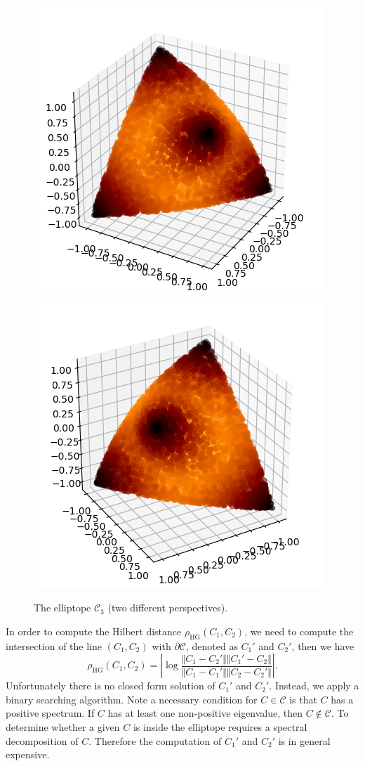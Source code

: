 \documentclass[graybox]{svmult}
\begin{document}
\begin{figure}[t]
\centering
\includegraphics[width=.4\textwidth]{elliptope30}
\includegraphics[width=.4\textwidth]{elliptope60}
\caption{The elliptope $\mathcal{C}_3$ (two different perspectives).}\label{fig:elliptope}
\end{figure}

In order to compute the Hilbert distance $\rho_{\mathrm{HG}}(C_1,C_2)$, we
need to compute the intersection of the line $(C_1,C_2)$ with 
$\partial\mathcal{C}$, denoted as $C_1'$ and $C_2'$, then we have
$$
\rho_{\mathrm{HG}}(C_1,C_2)=
\left\vert
\log\frac{\Vert{}C_1-C_2'\Vert \Vert{}C_1'-C_2\Vert}{\Vert{}C_1-C_1'\Vert \Vert{}C_2-C_2'\Vert}
\right\vert.
$$
Unfortunately there is no closed form solution of $C_1'$ and $C_2'$.
Instead, we apply a binary searching algorithm.
Note a necessary condition for $C\in\mathcal{C}$ is that $C$ has a positive spectrum.
If $C$ has at least one non-positive eigenvalue, then $C\notin\mathcal{C}$.
To determine whether a given $C$ is inside the elliptope requires a spectral
decomposition of $C$. Therefore the computation of $C_1'$ and $C_2'$ is in general expensive.
\end{document}
